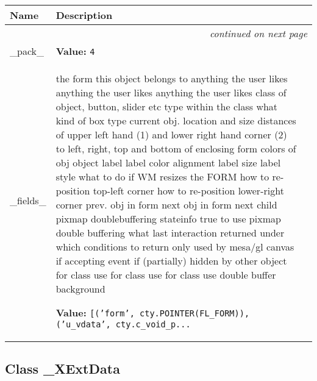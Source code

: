     \vspace{-1cm}
\hspace{\varindent}\begin{longtable}{|p{\varnamewidth}|p{\vardescrwidth}|l}
\cline{1-2}
\cline{1-2} \centering \textbf{Name} & \centering \textbf{Description}& \\
\cline{1-2}
\endhead\cline{1-2}\multicolumn{3}{r}{\small\textit{continued on next page}}\\\endfoot\cline{1-2}
\endlastfoot\raggedright \_\-p\-a\-c\-k\-\_\- & \raggedright \textbf{Value:} 
{\tt 4}&\\
\cline{1-2}
\raggedright \_\-f\-i\-e\-l\-d\-s\-\_\- & \raggedright the form this object belongs to
anything the user likes
anything the user likes
anything the user likes
class of object, button, slider etc
type within the class
what kind of box type
current obj. location and size
distances of upper left hand (1) and
lower right hand corner (2) to left,
right, top and bottom of enclosing
form
colors of obj
object label
label color
alignment
label size
label style
what to do if WM resizes the FORM
how to re-position top-left corner
how to re-position lower-right corner
prev. obj in form
next obj in form
next child
pixmap doublebuffering stateinfo
true to use pixmap double buffering
what last interaction returned
under which conditions to return
only used by mesa/gl canvas
if accepting event
if (partially) hidden by other object
for class use
for class use
for class use
double buffer background

\textbf{Value:} 
{\tt [('form', cty.POINTER(FL\_FORM)), ('u\_vdata', cty.c\_void\_p\texttt{...}}&\\
\cline{1-2}
\end{longtable}



\subsection{Class \_XExtData}

